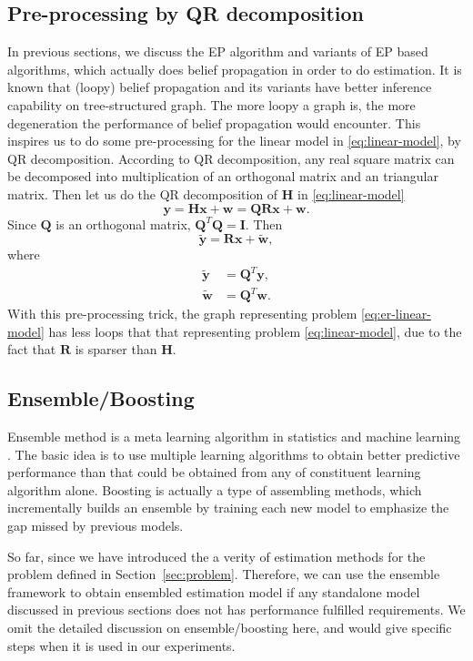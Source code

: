 \documentclass{article}
\begin{document}
\subsection{Pre-processing by QR decomposition}
In previous sections, we discuss the EP algorithm and variants of EP based algorithms, which actually does belief propagation in order to do estimation. It is known that (loopy) belief propagation and its variants have better inference capability on tree-structured graph. The more loopy a graph is, the more degeneration the performance of belief propagation would encounter.
This inspires us to do some pre-processing for the linear model in \eqref{eq:linear-model}, by QR decomposition. According to QR decomposition, any real square matrix can be decomposed into multiplication of an orthogonal matrix and an triangular matrix. Then let us do the QR decomposition of $\bm{H}$ in \eqref{eq:linear-model}
\begin{equation}
  \bm{y} = \bm{H}\bm{x} + \bm{w} = \bm{Q} \bm{R} \bm{x} + \bm{w}.
\end{equation}
Since $\bm{Q}$ is an orthogonal matrix, $\bm{Q}^{T} \bm{Q} = \bm{I}$. Then
\begin{equation}\label{eq:er-linear-model}
  \tilde{\bm{y}} =  \bm{R} \bm{x} + \tilde{\bm{w}},
\end{equation}
where
\begin{align}
  \tilde{\bm{y}} &= \bm{Q}^{T} \bm{y}, \\
  \tilde{\bm{w}} &= \bm{Q}^{T} \bm{w}.
\end{align}
With this pre-processing trick, the graph representing problem \eqref{eq:er-linear-model} has less loops that that representing problem \eqref{eq:linear-model}, due to the fact that $\bm{R}$ is sparser than $\bm{H}$.


\subsection{Ensemble/Boosting}\label{subsec:assemble}
Ensemble method is a meta learning algorithm in statistics and machine learning \cite{James:2014:ISL:2517747,DBLP:journals/corr/abs-1106-0257,Rokach2010}. The basic idea is to use multiple learning algorithms to obtain better predictive performance than that could be obtained from any of constituent learning algorithm alone.
Boosting is actually a type of assembling methods, which incrementally builds an ensemble by training each new model to emphasize the gap missed by previous models.

So far, since we have introduced the a verity of estimation methods for the problem defined in Section~\ref{sec:problem}. Therefore, we can use the ensemble framework to obtain ensembled estimation model if any standalone model discussed in previous sections does not has performance fulfilled requirements. We omit the detailed discussion on ensemble/boosting here, and would give specific steps when it is used in our experiments.
\end{document}
